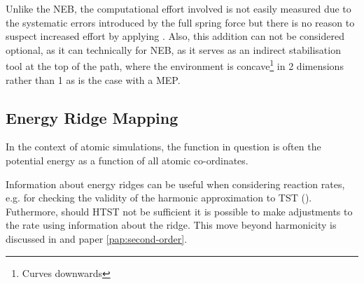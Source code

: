 Unlike the NEB, the computational effort involved is not easily measured due to the systematic errors introduced by the full spring force but there is no reason to suspect increased effort by applying .
Also, this addition can not be considered optional, as it can technically for NEB, as it serves as an indirect stabilisation tool at the top of the path, where the environment is concave\footnote{Curves downwards} in 2 dimensions rather than 1 as is the case with a MEP.

\subsection{Energy Ridge Mapping}
\label{sec:energy-ridge-mapping}
In the context of atomic simulations, the function in question is often the potential energy as a function of all atomic co-ordinates.

Information about energy ridges can be useful when considering reaction rates, e.g. for checking the validity of the harmonic approximation to TST ().
Futhermore, should HTST not be sufficient it is possible to make adjustments to the rate using information about the ridge.
This move beyond harmonicity is discussed in  and paper \ref{pap:second-order}.
